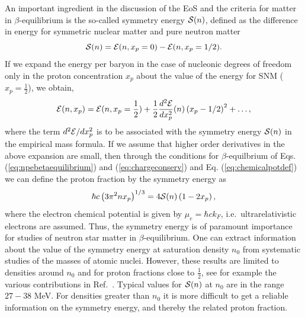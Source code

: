 An important ingredient in the discussion of the EoS and the criteria for
matter in $\beta$-equilibrium is the so-called symmetry energy ${\cal S} (n)$, 
defined as
the difference in energy for symmetric nuclear matter
and pure neutron matter 
\begin{equation}
      {\cal S} (n) = {\cal E} (n,x_p=0) - {\cal E} (n,x_p=1/2 ).
      \label{eq:symenergy}
\end{equation}
If we expand the energy per baryon in the case of nucleonic degrees of freedom 
only
in the proton concentration $x_p$ about the value of the energy 
for SNM ($x_p=\frac{1}{2}$), we obtain,
\begin{equation}
     {\cal E} (n,x_p)={\cal E} (n,x_p=\frac{1}{2})+
     \frac{1}{2}\frac{d^2 {\cal E}}{dx_p^2} (n)\left(x_p-1/2\right)^2+\dots ,
     \label{eq:energyexpansion}
\end{equation}
where the term $d^2 {\cal E}/dx_p^2$ 
is to be associated with the symmetry energy ${\cal S} (n)$ in the empirical
mass formula. If
we assume that higher order derivatives in the above expansion are small, then through the 
conditions
for $\beta$-equilbrium of Eqs. (\ref{eq:npebetaequilibrium}) and 
(\ref{eq:chargeconserv})
and Eq. (\ref{eq:chemicalpotdef}) we can define the proton
fraction by the symmetry energy as
\begin{equation}  
    \hbar c\left(3\pi^2nx_p\right)^{1/3} = 4{\cal S} (n)\left(1-2x_p\right),
    \label{eq:crudeprotonfraction}
\end{equation}
where the electron chemical potential is given
by $\mu_e = \hbar c k_F$, i.e.\  ultrarelativistic electrons are assumed.
Thus, the symmetry energy is of paramount importance for studies 
of neutron star matter in $\beta$-equilibrium.
One can extract information about the value of the symmetry energy at saturation 
density
$n_0$ from systematic studies of the masses of atomic nuclei. However, these 
results
are limited to densities around $n_0$ and for proton fractions close to 
$\frac{1}{2}$, see for example the various contributions in Ref.~\cite{symmetryenergy2013}.
Typical values for ${\cal S} (n)$ at $n_0$ are in the range $27-38$ MeV.
For densities greater than $n_0$ it is more difficult to get a reliable 
information on the symmetry energy, and thereby the related proton fraction.


